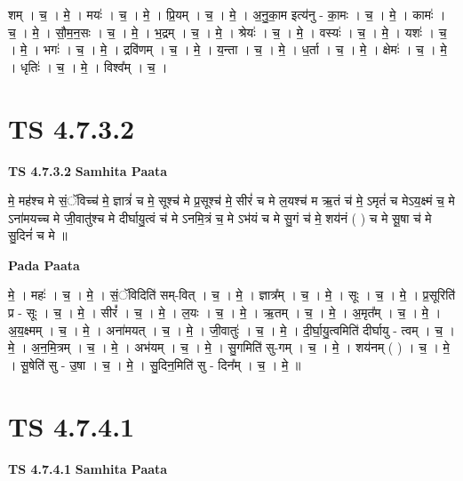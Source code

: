 \documentclass[17pt]{extarticle}
\begin{document}
शम् । च॒ । मे॒ । मयः॑ । च॒ । मे॒ । प्रि॒यम् । च॒ । मे॒ । अ॒नु॒का॒म इत्य॑नु - का॒मः । च॒ । मे॒ । कामः॑ । च॒ । मे॒ । सौ॒म॒न॒सः । च॒ । मे॒ । भ॒द्रम् । च॒ । मे॒ । श्रेयः॑ । च॒ । मे॒ । वस्यः॑ । च॒ । मे॒ । यशः॑ । च॒ । मे॒ । भगः॑ । च॒ । मे॒ । द्रवि॑णम् । च॒ । मे॒ । य॒न्ता । च॒ । मे॒ । ध॒र्ता । च॒ । मे॒ । क्षेमः॑ । च॒ । मे॒ । धृतिः॑ । च॒ । मे॒ । विश्व᳚म् । च॒ ।  \newline





\section{ TS 4.7.3.2 }

\textbf{TS 4.7.3.2 } \newline
\textbf{Samhita Paata} \newline

मे॒ मह॑श्च मे सं॒ॅविच्च॑ मे॒ ज्ञात्रं॑ च मे॒ सूश्च॑ मे प्र॒सूश्च॑ मे॒ सीरं॑ च मे ल॒यश्च॑ म ऋ॒तं च॑ मे॒ ऽमृतं॑ च मेऽय॒क्ष्मं च॒ मे ऽना॑मयच्च मे जी॒वातु॑श्च मे दीर्घायु॒त्वं च॑ मे ऽनमि॒त्रं च॒ मे ऽभ॑यं च मे सु॒गं च॑ मे॒ शय॑नं ( ) च मे सू॒षा च॑ मे सु॒दिनं॑ च मे ॥ \newline

\textbf{Pada Paata} \newline

मे॒ । महः॑ । च॒ । मे॒ । सं॒ॅविदिति॑ सम्-वित् । च॒ । मे॒ । ज्ञात्र᳚म् । च॒ । मे॒ । सूः । च॒ । मे॒ । प्र॒सूरिति॑ प्र - सूः । च॒ । मे॒ । सीरं᳚ । च॒ । मे॒ । ल॒यः । च॒ । मे॒ । ऋ॒तम् । च॒ । मे॒ । अ॒मृत᳚म् । च॒ । मे॒ । अ॒य॒क्ष्मम् । च॒ । मे॒ । अना॑मयत् । च॒ । मे॒ । जी॒वातुः॑ । च॒ । मे॒ । दी॒र्घा॒यु॒त्वमिति॑ दीर्घायु - त्वम् । च॒ । मे॒ । अ॒न॒मि॒त्रम् । च॒ । मे॒ । अभ॑यम् । च॒ । मे॒ । सु॒गमिति॑ सु-गम् । च॒ । मे॒ । शय॑नम् ( ) । च॒ । मे॒ । सू॒षेति॑ सु - उ॒षा । च॒ । मे॒ । सु॒दिन॒मिति॑ सु - दिन᳚म् । च॒ । मे॒ ॥  \newline





\section{ TS 4.7.4.1 }

\textbf{TS 4.7.4.1 } \newline
\textbf{Samhita Paata} \newline
\end{document}
